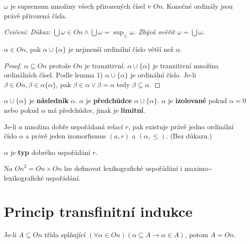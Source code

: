 \begin{dusl}
	$\omega$ je supremum množiny všech přirozených čísel v $On$. Konečné ordinály jsou právě přirozená čísla.
\end{dusl}

\textit{Cvičení: Důkaz: $\bigcup \omega \in On \land \bigcup \omega = \sup_{\leq}\omega$. Zbývá ověřit $\omega = \bigcup \omega$.}

\begin{lemma}
	$\alpha \in On$, pak $\alpha \cup \{\alpha\}$ je nejmenší ordinální číslo větší než $\alpha$.
\end{lemma}

\begin{proof}
	$\alpha \subseteq On$ protože $On$ je tranzitivní. $\alpha \cup \{\alpha\}$ je tranzitivní množina ordinálních čísel. Podle lemma 1) $\alpha \cup \{\alpha\}$ je ordinální číslo. Je-li $\beta \in On, \beta \in \alpha \{\alpha\}$, pak $\beta \in \alpha \lor \beta = \alpha$ tedy $\beta \subseteq \alpha$.
\end{proof}

\begin{definice}
	$\alpha \cup \{\alpha\}$ je \textbf{následník} $\alpha$. $\alpha$ je \textbf{předchůdce} $\alpha \cup \{\alpha\}$. $\alpha$ je \textbf{izolované} pokud $\alpha = 0$ nebo pokud $\alpha$ má předchůdce, jinak je \textbf{limitní}.
\end{definice}

\begin{thm}
	Je-li $a$ množina dobře uspořádaná relací $r$, pak existuje právě jedno ordinální číslo $\alpha$ a právě jeden izomorfismus $(a,r)$ a $(\alpha, \leq)$. (Bez důkazu.)
\end{thm}

\begin{definice}
	$\alpha$ je \textbf{typ} dobrého uspořádání $r$.
\end{definice}

\begin{pozn}
	Na ${On}^{2} = On \times On$ lze definovat lexikografické uspořádání i maximo-\newline -lexikografické uspořádání.
\end{pozn}

\section{Princip transfinitní indukce}

Je-li $A \subseteq On$ třída splňující $(\forall \alpha \in On)(\alpha \subseteq A \rightarrow \alpha \in A)$, potom $A = On$.

